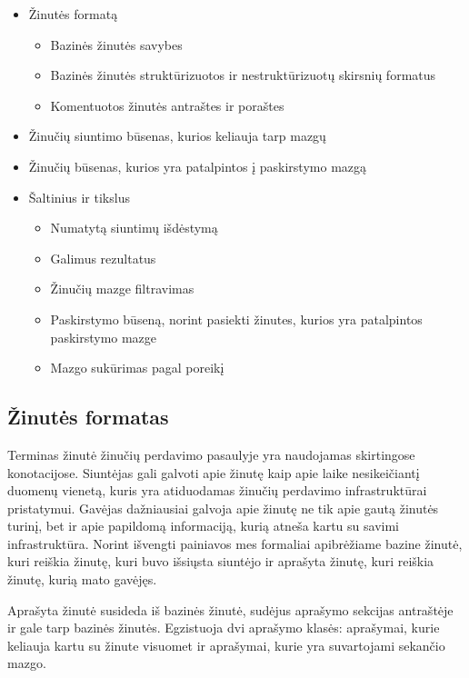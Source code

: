 \documentclass[12pt, a4paper, lithuanian]{article}
\begin{document}
    \begin{itemize}
        \item Žinutės formatą
        \begin{itemize}
            \item Bazinės žinutės savybes
            \item Bazinės žinutės struktūrizuotos ir nestruktūrizuotų skirsnių formatus 
            \item Komentuotos žinutės antraštes ir poraštes
        \end{itemize}
        \item Žinučių siuntimo būsenas, kurios keliauja tarp mazgų
        \item Žinučių būsenas, kurios yra patalpintos į paskirstymo mazgą
        \item Šaltinius ir tikslus
        \begin{itemize}
            \item Numatytą siuntimų išdėstymą 
            \item Galimus rezultatus
            \item Žinučių mazge filtravimas
            \item Paskirstymo būseną, norint pasiekti žinutes, kurios yra patalpintos paskirstymo mazge
            \item Mazgo sukūrimas pagal poreikį
        \end{itemize}
    \end{itemize}

    \subsection{Žinutės formatas}

    Terminas žinutė žinučių perdavimo pasaulyje yra naudojamas skirtingose konotacijose.
    Siuntėjas gali galvoti apie žinutę kaip apie laike nesikeičiantį duomenų vienetą, kuris yra atiduodamas žinučių perdavimo infrastruktūrai pristatymui.
    Gavėjas dažniausiai galvoja apie žinutę ne tik apie gautą žinutės turinį, bet ir apie papildomą informaciją, kurią atneša kartu su savimi infrastruktūra.
    Norint išvengti painiavos mes formaliai apibrėžiame bazine žinutė, kuri reiškia žinutę, kuri buvo išsiųsta siuntėjo ir aprašyta žinutę, kuri reiškia žinutę, kurią mato gavėjęs.

    Aprašyta žinutė susideda iš bazinės žinutė, sudėjus aprašymo sekcijas antraštėje ir gale tarp bazinės žinutės.
    Egzistuoja dvi aprašymo klasės: aprašymai, kurie keliauja kartu su žinute visuomet ir aprašymai, kurie yra suvartojami sekančio mazgo.
\end{document}
